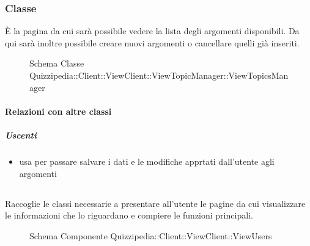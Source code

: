 \subsubsection{Classe }
È la pagina da cui sarà possibile vedere la lista degli argomenti disponibili. Da qui sarà inoltre possibile creare nuovi argomenti o cancellare quelli già inseriti.
\begin{figure}[H]
\centering
\noindent{}
\caption[Schema Classe ViewTopicsManager]{Schema Classe Quizzipedia::Client::ViewClient::ViewTopicManager::ViewTopicsManager}
\end{figure}
\paragraph{Relazioni con altre classi}
\subparagraph{Uscenti}
\begin{itemize}
\item usa  per passare salvare i dati e le modifiche apprtati dall'utente agli argomenti
\end{itemize}
\subsection{}
Raccoglie le classi necessarie a presentare all'utente le pagine da cui visualizzare le informazioni che lo riguardano e compiere le funzioni principali.
\begin{figure}[H]
\centering
\noindent{}
\caption[Schema Componente Quizzipedia::Client::ViewClient::ViewUsers]{Schema Componente Quizzipedia::Client::ViewClient::ViewUsers}
\end{figure}
